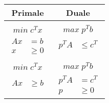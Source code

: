 \documentclass{article}
\begin{document}
        \begin{preview}
                \begin{center}
                        \begin{tabular}{c c}
                                Primale & Duale \\
                                \hline
                                \\
                                $ min \; c^{T}x $ & $ max \; p^{T}b $ \\
                                \begin{math}
                                        \begin{aligned}
                                                Ax & = b \\
                                                x & \geq{0}
                                        \end{aligned}
                                \end{math} &
                                        \begin{math}
                                                \begin{aligned}
                                                        p^{T}A & \leq{c^T} \\
                                                        &
                                                \end{aligned}
                                        \end{math} \\
                                \\
                                $ min \; c^{T}x $ & $ max \; p^{T}b $ \\
                                \begin{math}
                                        \begin{aligned}
                                                Ax & \geq{b} \\
                                                &
                                        \end{aligned}
                                \end{math} &
                                        \begin{math}
                                                \begin{aligned}
                                                        p^{T}A & = c^T \\
                                                        p & \geq{0}
                                                \end{aligned}
                                        \end{math}
                        \end{tabular}


\end{center}
\end{preview}
\end{document}
